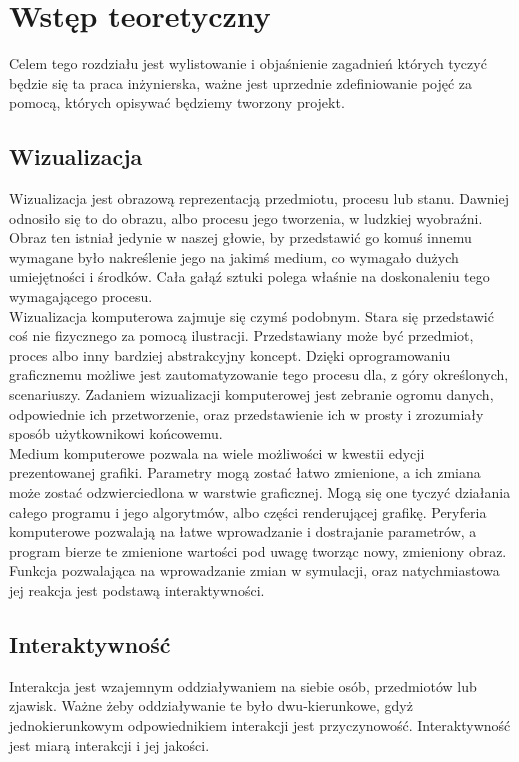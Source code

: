 \documentclass{article} %
\begin{document}
\newpage

\section{Wstęp teoretyczny}
    Celem tego rozdziału jest wylistowanie i objaśnienie zagadnień których tyczyć będzie się ta praca inżynierska, ważne jest uprzednie zdefiniowanie pojęć za pomocą, których opisywać będziemy tworzony projekt.
    \\
   
    \subsection{Wizualizacja}
        Wizualizacja jest obrazową reprezentacją przedmiotu, procesu lub stanu. Dawniej odnosiło się to do obrazu, albo procesu jego tworzenia, w ludzkiej wyobraźni. Obraz ten istniał jedynie w naszej głowie, by przedstawić go komuś innemu wymagane było nakreślenie jego na jakimś medium, co wymagało dużych umiejętności i środków. Cała gałąź sztuki polega właśnie na doskonaleniu tego wymagającego procesu. \cite{visualization}
        \\
        
        Wizualizacja komputerowa zajmuje się czymś podobnym. Stara się przedstawić coś nie fizycznego za pomocą ilustracji. Przedstawiany może być przedmiot, proces albo inny bardziej abstrakcyjny koncept. Dzięki oprogramowaniu graficznemu możliwe jest zautomatyzowanie tego procesu dla, z góry określonych, scenariuszy. Zadaniem wizualizacji komputerowej jest zebranie ogromu danych, odpowiednie ich przetworzenie, oraz przedstawienie ich w prosty i zrozumiały sposób użytkownikowi końcowemu.
        \\
        
        Medium komputerowe pozwala na wiele możliwości w kwestii edycji prezentowanej grafiki. Parametry mogą zostać łatwo zmienione, a ich zmiana może zostać odzwierciedlona w warstwie graficznej. Mogą się one tyczyć działania całego programu i jego algorytmów, albo części renderującej grafikę. Peryferia komputerowe pozwalają na łatwe wprowadzanie i dostrajanie parametrów, a program bierze te zmienione wartości pod uwagę tworząc nowy, zmieniony obraz. Funkcja pozwalająca na wprowadzanie zmian w symulacji, oraz natychmiastowa jej reakcja jest podstawą interaktywności.
        \\
            
    \subsection{Interaktywność}
        Interakcja jest wzajemnym oddziaływaniem na siebie osób, przedmiotów lub zjawisk.\cite{pwn} Ważne żeby oddziaływanie te było dwu-kierunkowe, gdyż jednokierunkowym odpowiednikiem interakcji jest przyczynowość. Interaktywność jest miarą interakcji i jej jakości. 
        \\
    
\end{document}
